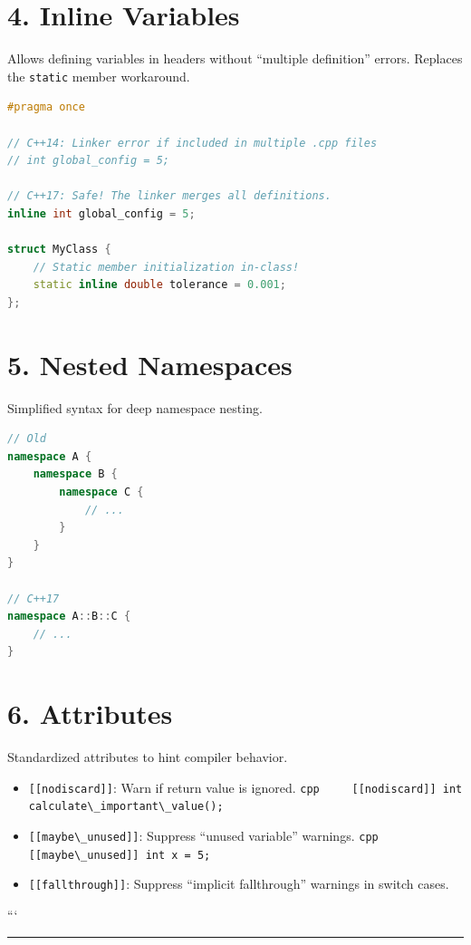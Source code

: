 \hypertarget{inline-variables}{%
\section{4. Inline Variables}\label{inline-variables}}

Allows defining variables in headers without ``multiple definition''
errors. Replaces the \passthrough{\lstinline!static!} member workaround.

\begin{lstlisting}[language={C++}]
#pragma once

// C++14: Linker error if included in multiple .cpp files
// int global_config = 5; 

// C++17: Safe! The linker merges all definitions.
inline int global_config = 5; 

struct MyClass {
    // Static member initialization in-class!
    static inline double tolerance = 0.001;
};
\end{lstlisting}

\hypertarget{nested-namespaces}{%
\section{5. Nested Namespaces}\label{nested-namespaces}}

Simplified syntax for deep namespace nesting.

\begin{lstlisting}[language={C++}]
// Old
namespace A {
    namespace B {
        namespace C {
            // ...
        }
    }
}

// C++17
namespace A::B::C {
    // ...
}
\end{lstlisting}

\hypertarget{attributes}{%
\section{6. Attributes}\label{attributes}}

Standardized attributes to hint compiler behavior.

\begin{itemize}
\tightlist
\item
  \passthrough{\lstinline![[nodiscard]]!}: Warn if return value is
  ignored.
  \passthrough{\lstinline!cpp     [[nodiscard]] int calculate\_important\_value();!}
\item
  \passthrough{\lstinline![[maybe\_unused]]!}: Suppress ``unused
  variable'' warnings.
  \passthrough{\lstinline!cpp     [[maybe\_unused]] int x = 5;!}
\item
  \passthrough{\lstinline![[fallthrough]]!}: Suppress ``implicit
  fallthrough'' warnings in switch cases.
\end{itemize}

```

\begin{center}\rule{0.5\linewidth}{0.5pt}\end{center}
